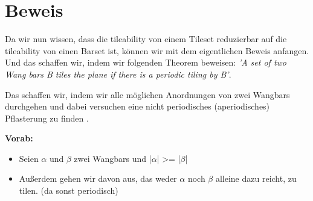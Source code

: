 \section{Beweis}
Da wir nun wissen, dass die tileability von einem Tileset reduzierbar auf die tileability von einen Barset ist, können wir mit dem eigentlichen Beweis anfangen. Und das schaffen wir, indem wir folgenden Theorem beweisen: {\itshape'A set of two Wang bars B tiles the plane if there is a periodic tiling by B'}. 

Das schaffen wir, indem wir alle möglichen Anordnungen von zwei Wangbars durchgehen und dabei versuchen eine nicht periodisches (aperiodisches) Pflasterung zu finden .

\textbf{Vorab:}
\begin{itemize}
    \item Seien $\alpha$ und $\beta$ zwei Wangbars und |$\alpha$| >= |$\beta$|
    \item Außerdem gehen wir davon aus, das weder $\alpha$ noch $\beta$ alleine dazu reicht, zu tilen. (da sonst periodisch)
\end{itemize}

